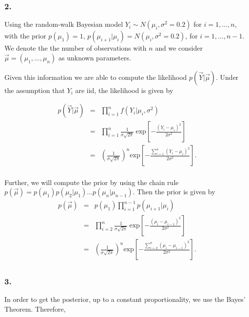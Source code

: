 \documentclass[]{article}
\begin{document}
\hypertarget{section-7}{%
\subsubsection{2.}\label{section-7}}

Using the random-walk Bayesian model
\(Y_{i} \sim N(\mu_{i}, \sigma^2=0.2)\) for \(i=1,...,n\), with the
prior \(p(\mu_1)=1\), \(p(\mu_{i+1}|\mu_i)=N(\mu_i,\sigma^2=0.2)\), for
\(i=1,...,{n-1}\). We denote the the number of observations with \(n\)
and we consider \(\vec{\mu}=(\mu_{1},...,\mu_{n})\) as unknown
parameters.

Given this information we are able to compute the likelihood
\(p(\vec{Y}|\vec{\mu})\). Under the assumption that \(Y_i\) are iid, the
likelihood is given by

\begin{eqnarray*}
p(\vec{Y}|\vec{\mu}) &=& \prod_{i=1}^{n}f(Y_{i}|\mu_{i},\sigma^2) \\
                     &=& \prod_{i=1}^{n}\frac{1}{\sigma\sqrt{2\pi}} \ \text{exp}\left[-\frac{(Y_{i}-\mu_{i})^2}{2\sigma^{2}}\right]\\
                     &=& \left(\frac{1}{\sigma\sqrt{2\pi}}\right)^n \text{exp}\left[-\frac{\sum_{i=1}^{n}(Y_{i}-\mu_{i})^2}{2\sigma^{2}}\right].\\
\end{eqnarray*}

Further, we will compute the prior by using the chain rule
\(p(\vec{\mu})=p(\mu_{1})p(\mu_{2}|\mu_{1})...p(\mu_{n}|\mu_{n-1})\).
Then the prior is given by \begin{eqnarray*}
p(\vec{\mu}) &=& p(\mu_1)\prod_{i=1}^{n-1}p(\mu_{i+1}|\mu_{i}) \\
             &=& \prod_{i=2}^{n}\frac{1}{\sigma\sqrt{2\pi}} \ \text{exp}\left[-\frac{(\mu_{i}-\mu_{i-1})^2}{2\sigma^{2}}\right]\\
             &=& \left(\frac{1}{\sigma\sqrt{2\pi}}\right)^n \text{exp} \left[-\frac{\sum_{i=2}^{n}(\mu_{i}-\mu_{i-1})^2}{2\sigma^{2}}\right]. \\
\end{eqnarray*}

\hypertarget{section-8}{%
\subsubsection{3.}\label{section-8}}

In order to get the posterior, up to a constant proportionality, we use
the Bayes' Theorem. Therefore,
\end{document}
